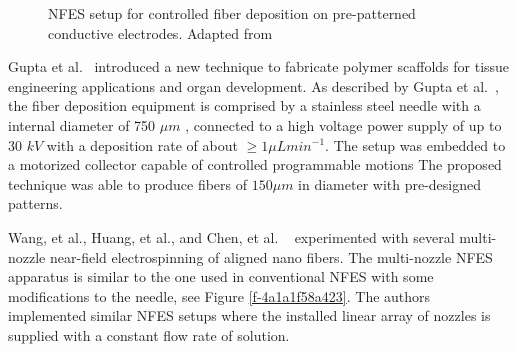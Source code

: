 \bgroup
\begin{figure}[!htbp]
\centering \makeatletter{}
\makeatother 
\caption{{NFES setup for controlled fiber deposition on pre-patterned conductive electrodes. Adapted from \unskip~\protect\cite{527120:11974313}}}
\label{f-927e96fb5537}
\end{figure}
\egroup
Gupta et al.\unskip~\cite{527120:11974310} introduced a new technique to fabricate polymer scaffolds for tissue engineering applications and organ development. As described by Gupta et al.\unskip~\cite{527120:11974310}, the fiber deposition equipment is comprised by a stainless steel needle with a internal diameter of 750 $\mu m $ , connected to a high voltage power supply of up to 30 $k V $ with a deposition rate of about $\geq 1 \mu L min^{-1} $. The setup was embedded to a motorized collector capable of controlled programmable motions
The proposed technique was able to produce fibers of $150 \mu m $ in diameter with pre-designed patterns.


\bgroup
\egroup
Wang, et al., Huang, et al., and Chen, et al. \unskip~\cite{527120:11974322,527120:11974323,527120:11974324} experimented with several multi-nozzle near-field electrospinning of aligned nano fibers. The multi-nozzle NFES apparatus is similar to the one used in conventional NFES with some modifications to the needle, see Figure \ref{f-4a1a1f58a423}. The authors implemented similar NFES setups where the installed linear array of nozzles is supplied with a constant flow rate of solution.

